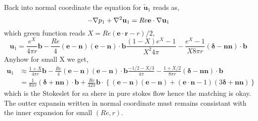 Back into normal coordinate the equation for $\widetilde{\textbf{u}}_1$ reads as,
\begin{equation}
    - {\mathbf{\nabla}} {p}_1 +  {\mathbf{\nabla}}^2 {\textbf{u}}_1
    =
     Re \textbf{e} \cdot {\mathbf{\nabla}} {\textbf{u}}_1
\end{equation}
which green function reads $X = Re (\textbf{e}\cdot \textbf{r} - r)/2$,
\begin{equation}
    \textbf{u}_1 =
    \frac{e^X}{4\pi r} \textbf{b}
    -
    \frac{Re}{4}(\textbf{e} - \textbf{n})
    (\textbf{e} - \textbf{n})\cdot \textbf{b}
    \frac{(1-X) e^X - 1}{X^2 4 \pi}
    - \frac{e^X- 1}{X 8 \pi r}  (\bm\delta  - \textbf{nn} )\cdot \textbf{b}
\end{equation}
Anyhow for small X we get,
\begin{align}
    \textbf{u}_1 &\approx
    \frac{1+X}{4\pi r} \textbf{b}
    -
    \frac{Re}{4}(\textbf{e} - \textbf{n})
    (\textbf{e} - \textbf{n})\cdot \textbf{b}
    \frac{-1/2-X/3}{ 4 \pi}
    - \frac{1+X/2}{8 \pi r}  (\bm\delta  - \textbf{nn} )\cdot \textbf{b}\\
    &=\frac{1}{8 \pi r}  (\bm\delta  + \textbf{nn} )\cdot \textbf{b} +
     \frac{Re}{32\pi }\textbf{b}\cdot \left\{
         (\textbf{e} - \textbf{n})
        (\textbf{e} - \textbf{n})
        +(\textbf{e}\cdot \textbf{n} - 1)  (3\bm\delta  + \textbf{nn} )
    \right\}
\end{align}
which
 is the Stokeslet for sa shere in pure stokes flow hence the matching is okay.
The outter expansin written in normal coordinate must remains consistant with the inner expansion for small $(Re,r)$.

